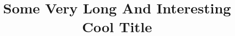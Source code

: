 \documentclass[final, expex]{classdefs/uga}
\title[Some Cool Title]{Some Very Long And Interesting Cool Title}
\author[Jane Smith \& John Everyman]{
  \ugaauthor{Jane Smith \\ \institute{University of Nowhere}}
  \AND
  \ugaauthor{John Everyman \\ \institute{University of Someplace}}
}
\begin{document}
\maketitle

\begin{abstract}
\end{abstract}
\begin{keywords}
\end{keywords}

% 
% 
% 

\clearpage
\printbibliography
\end{document}
